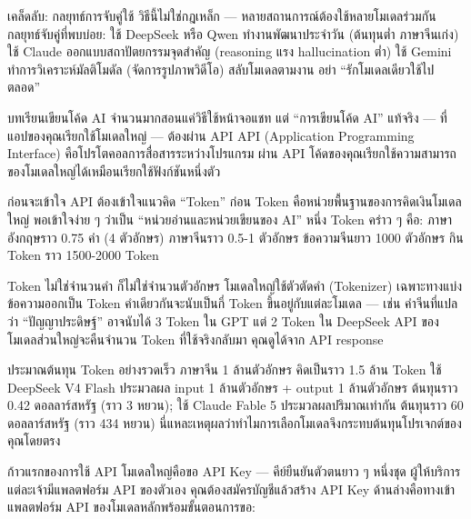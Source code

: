 \begin{tcbinfo}{เคล็ดลับ: กลยุทธ์การจับคู่ใช้}
วิธีนี้ไม่ใช่กฎเหล็ก — หลายสถานการณ์ต้องใช้หลายโมเดลร่วมกัน กลยุทธ์จับคู่ที่พบบ่อย: ใช้ DeepSeek หรือ Qwen ทำงานพัฒนาประจำวัน (ต้นทุนต่ำ ภาษาจีนเก่ง) ใช้ Claude ออกแบบสถาปัตยกรรมจุดสำคัญ (reasoning แรง hallucination ต่ำ) ใช้ Gemini ทำการวิเคราะห์มัลติโมดัล (จัดการรูปภาพวิดีโอ) สลับโมเดลตามงาน อย่า “รักโมเดลเดียวใช้ไปตลอด”

\end{tcbinfo}


บทเรียนเขียนโค้ด AI จำนวนมากสอนแค่วิธีใช้หน้าจอแชท แต่ “การเขียนโค้ด AI” แท้จริง — ที่แอปของคุณเรียกใช้โมเดลใหญ่ — ต้องผ่าน API API (Application Programming Interface) คือโปรโตคอลการสื่อสารระหว่างโปรแกรม ผ่าน API โค้ดของคุณเรียกใช้ความสามารถของโมเดลใหญ่ได้เหมือนเรียกใช้ฟังก์ชันหนึ่งตัว


ก่อนจะเข้าใจ API ต้องเข้าใจแนวคิด “Token” ก่อน Token คือหน่วยพื้นฐานของการคิดเงินโมเดลใหญ่ พอเข้าใจง่าย ๆ ว่าเป็น “หน่วยอ่านและหน่วยเขียนของ AI” หนึ่ง Token คร่าว ๆ คือ: ภาษาอังกฤษราว 0.75 คำ (4 ตัวอักษร) ภาษาจีนราว 0.5-1 ตัวอักษร ข้อความจีนยาว 1000 ตัวอักษร กิน Token ราว 1500-2000 Token

Token ไม่ใช่จำนวนคำ ก็ไม่ใช่จำนวนตัวอักษร โมเดลใหญ่ใช้ตัวตัดคำ (Tokenizer) เฉพาะทางแบ่งข้อความออกเป็น Token คำเดียวกันจะนับเป็นกี่ Token ขึ้นอยู่กับแต่ละโมเดล — เช่น คำจีนที่แปลว่า “ปัญญาประดิษฐ์” อาจนับได้ 3 Token ใน GPT แต่ 2 Token ใน DeepSeek API ของโมเดลส่วนใหญ่จะคืนจำนวน Token ที่ใช้จริงกลับมา คุณดูได้จาก API response

\begin{tcbinfo}{ประมาณต้นทุน Token อย่างรวดเร็ว}
ภาษาจีน 1 ล้านตัวอักษร คิดเป็นราว 1.5 ล้าน Token ใช้ DeepSeek V4 Flash ประมวลผล input 1 ล้านตัวอักษร + output 1 ล้านตัวอักษร ต้นทุนราว 0.42 ดอลลาร์สหรัฐ (ราว 3 หยวน); ใช้ Claude Fable 5 ประมวลผลปริมาณเท่ากัน ต้นทุนราว 60 ดอลลาร์สหรัฐ (ราว 434 หยวน) นี่แหละเหตุผลว่าทำไมการเลือกโมเดลจึงกระทบต้นทุนโปรเจกต์ของคุณโดยตรง

\end{tcbinfo}


ก้าวแรกของการใช้ API โมเดลใหญ่คือขอ API Key — คีย์ยืนยันตัวตนยาว ๆ หนึ่งชุด ผู้ให้บริการแต่ละเจ้ามีแพลตฟอร์ม API ของตัวเอง คุณต้องสมัครบัญชีแล้วสร้าง API Key ด้านล่างคือทางเข้าแพลตฟอร์ม API ของโมเดลหลักพร้อมขั้นตอนการขอ:

